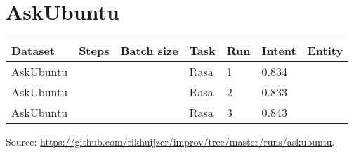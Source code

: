 \section{AskUbuntu}
\label{sec:runs_askubuntu}
\begin{center}
    \begin{tabular}{l l l l l l l}
        \textbf{Dataset} & \textbf{Steps} & \textbf{Batch size} & \textbf{Task} & \textbf{Run} & \textbf{Intent} & \textbf{Entity} \\
        \hline
        AskUbuntu & & & Rasa & 1 & 0.834 \\
        AskUbuntu & & & Rasa & 2 & 0.833 \\
        AskUbuntu & & & Rasa & 3 & 0.843 \\
    \end{tabular}
\end{center}

\noindent Source: \url{https://github.com/rikhuijzer/improv/tree/master/runs/askubuntu}.

